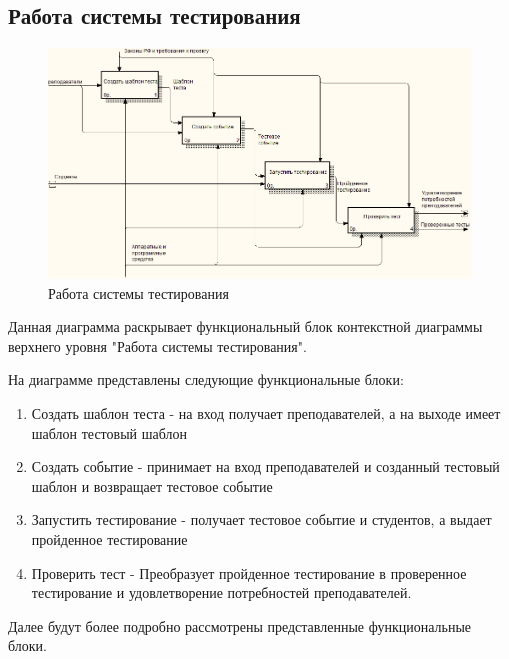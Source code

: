     \subsection{Работа системы тестирования}
    \begin{figure}[H]
        \includegraphics[width=\textwidth, center]{../img/idef0/context_decompose.png}
        \caption{Работа системы тестирования}
    \end{figure}

    Данная диаграмма раскрывает функциональный блок контекстной
    диаграммы верхнего уровня "Работа системы тестирования".

    На диаграмме представлены следующие функциональные блоки:
    \begin{enumerate}
        \item Создать шаблон теста - на вход получает преподавателей, а на выходе имеет 
        шаблон тестовый шаблон
        \item Создать событие - принимает на вход преподавателей и созданный тестовый
        шаблон и возвращает тестовое событие
        \item Запустить тестирование - получает тестовое событие и студентов, а
        выдает пройденное тестирование
        \item Проверить тест - Преобразует пройденное тестирование в проверенное
        тестирование и удовлетворение потребностей преподавателей.
    \end{enumerate}

    Далее будут более подробно рассмотрены представленные функциональные блоки.

